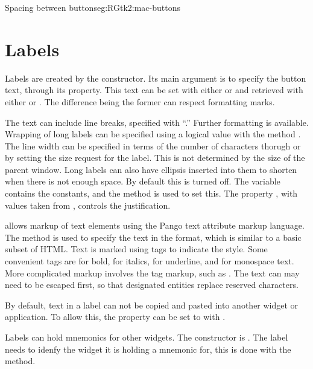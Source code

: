 \begin{example}{Spacing between buttons}{eg:RGtk2:mac-buttons}
\end{example}

\section{Labels}
\label{sec:RGtk2:gtkLabel}

Labels are created by the  constructor. Its main
argument is  to specify the button text,
through its  property. This text can be set with either
 or  and
retrieved with either  or .
The difference being the former can respect formatting marks. 

The text can include line breaks, specified with ``\code{\backslashn}.''
Further formatting is available. Wrapping of long labels can be
specified using a logical value with the method
. The line width can be specified in
terms of the number of characters thorugh
 or by setting the size request for
the label. This is not determined by the size of the parent
window. Long labels can also have ellipsis inserted into them to
shorten when there is not enough space. By default this is turned
off. The variable  contains the constants,
and the method  is used to set this.
The property , with values taken from
, controls the justification.


\GTK\/ allows markup of text elements using the Pango text attribute
markup language. The method  is used to
specify the text in the format, which is similar to a basic subset of
HTML. Text is marked using tags to indicate the style. Some convenient
tags are  for bold,  for italics,  for
underline, and  for monospace text. More complicated markup
involves the  tag markup, such as . The text can may need to be escaped first, so that designated entities replace reserved characters.



By default, text in a label can not be copied and pasted into another
widget or application. To allow this, the  property
can be set to  with .

Labels can hold mnemonics for other widgets. The constructor is . The label needs to idenfy the widget it is holding a mnemonic for, this is done with the  method.

